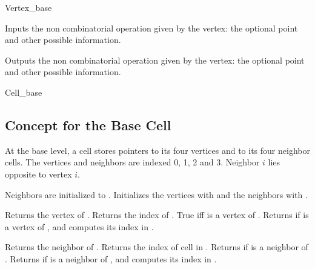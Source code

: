 \begin{ccClass}{Vertex_base}

{Inputs the non combinatorial operation given by the vertex: 
the optional point and other possible information.
} 

{Outputs the non combinatorial operation given by the vertex: the
optional point and other possible information.
} 

	\end{ccClass}

	\begin{ccClass}{Cell_base}
	\subsection{Concept for the Base Cell }


At the base level, a cell stores  pointers to its four
vertices and to its four neighbor cells. 
The vertices and neighbors are indexed 0, 1, 2 and 3. Neighbor $i$
lies opposite to vertex $i$.

\ccCreation

\ccConstructor{\ccClassName();}{}
\ccGlue
{}
{Neighbors are initialized to .}
\ccGlue
{} 
{Initializes the vertices with  and the neighbors with
.}
                    
\ccAccessFunctions

{Returns the vertex  of \ccVar.
}
\ccGlue
{}
{Returns the index of .
}
\ccGlue
{}
{True iff  is a vertex of \ccVar.}
\ccGlue
{}
{Returns  if  is a vertex of \ccVar, and
computes its index  in \ccVar.}

{Returns  the neighbor  of \ccVar.
}
\ccGlue
{}
{Returns the index of cell  in \ccVar.
}
\ccGlue
{}
{Returns  if  is a neighbor of \ccVar.}
\ccGlue
{}
{Returns  if  is a neighbor of \ccVar,  and
computes its index  in \ccVar.}


\end{ccClass}
